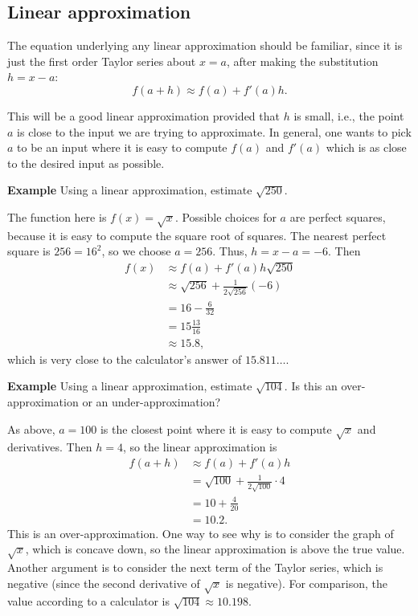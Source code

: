\documentclass[twoside,openright,titlepage,a4paper]{book}
\begin{document}
\begin{sloppypar}
\subsection{Linear approximation}
The equation underlying any linear approximation should be familiar, since it is just the first order Taylor series about $x=a$, after making the substitution $h = x-a$: \[ f(a+h) \approx f(a) + f'(a)h. \]

This will be a good linear approximation provided that $h$ is small, i.e., the point $a$ is close to the input we are trying to approximate. In general, one wants to pick $a$ to be an input where it is easy to compute $f(a)$ and $f'(a)$ which is as close to the desired input as possible.

\textbf{Example} Using a linear approximation, estimate $\sqrt{250}$.
\begin{examplebox}
The function here is $f(x) = \sqrt{x}$. Possible choices for $a$ are perfect squares, because it is easy to compute the square root of squares. The nearest perfect square is $256 = 16^2$, so we choose $a = 256$. Thus, $h = x-a = -6$. Then
\begin{align*}
f(x) &\approx f(a) + f'(a)h \sqrt{ 250 } \\
&\approx \sqrt{256} + \frac{1}{2\sqrt{256}}(-6) \\
&= 16 - \frac{6}{32} \\
&= 15 \frac{13}{16} \\
& \approx 15.8,
\end{align*}
which is very close to the calculator's answer of $15.811 \ldots $.	
\end{examplebox}

\textbf{Example} Using a linear approximation, estimate $\sqrt{104}$. Is this an over-approximation or an under-approximation?

\begin{examplebox}	
As above, $a=100$ is the closest point where it is easy to compute $\sqrt{x}$ and derivatives. Then $h = 4$, so the linear approximation is
\begin{align*}
f(a + h) &\approx f(a) + f'(a)h \\
&= \sqrt{100} + \frac{1}{2\sqrt{100}} \cdot 4 \\
&= 10 + \frac{4}{20} \\
&= 10.2.
\end{align*}
This is an over-approximation. One way to see why is to consider the graph of $\sqrt{x}$, which is concave down, so the linear approximation is above the true value. Another argument is to consider the next term of the Taylor series, which is negative (since the second derivative of $\sqrt{x}$ is negative).
For comparison, the value according to a calculator is $\sqrt{104} \approx 10.198$.
\end{examplebox}


\end{sloppypar}
\end{document}
